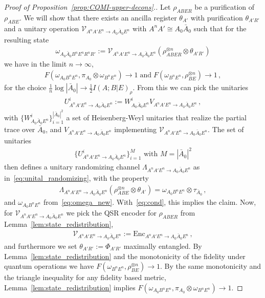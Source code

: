 \documentclass[a4paper,aps,prl,twocolumn,10pt,superscriptaddress]{revtex4-1}
\theoremstyle{plain}
\theoremstyle{definition}
\begin{document}
\begin{proof}[Proof of Proposition~\ref{prop:CQMI-upper-decons}.]
Let $\rho_{ABER}$ be a purification of $\rho_{ABE}$. We will show that there exists an ancilla register $\theta_{A'}$ with purification $\theta_{A'R'}$ and a unitary operation $\mathcal{V}_{A^nA'E^n\to A_0\bar{A}_0E^n}$ with $A^nA'\cong A_0\bar{A}_0$ such that for the resulting state
\begin{align}\label{eq:omega_new}
\omega_{A_0\bar{A}_0B^nE^nR^nR'}:=\mathcal{V}_{A^nA'E^n\to A_0\bar{A}_0E^n}\left(\rho_{ABER}^{\otimes n}\otimes\theta_{A'R'}\right)
\end{align}
we have in the limit $n\to\infty$,
\begin{align}\label{eq:cond}
F(\omega_{A_0B^nE^n},\pi_{A_0}\otimes\omega_{B^nE^n})\to1\;\mathrm{and}\;F\left(\omega_{B^nE^n},\rho_{BE}^{\otimes n}\right)\to1\,,
\end{align}
for the choice $\frac{1}{n}\log\left|\bar{A}_0\right|\to\frac{1}{2}I(A;B|E)_\rho$. From this we can pick the unitaries
\begin{align*}
U^i_{A^nA'E^n\to A_0\bar{A}_0E^n}:=W^i_{A_0\bar{A}_0E^n}V_{A^nA'E^n\to A_0\bar{A}_0E^n}\,,
\end{align*}
with $\{W^i_{A_0\bar{A}_0E^n}\}_{i=1}^{|\bar{A}_0|^2}$ a set of Heisenberg-Weyl unitaries that realize the partial trace over $\bar{A}_0$, and $V_{A^nA'E^n\to A_0\bar{A}_0E^n}$ implementing $\mathcal{V}_{A^nA'E^n\to A_0\bar{A}_0E^n}$. The set of unitaries
\begin{align*}
\text{$\{U^i_{A^nA'E^n\to A_0\bar{A}_0E^n}\}_{i=1}^M$ with $M=\left|\bar{A}_0\right|^2$}
\end{align*}
then defines a unitary randomizing channel $\Lambda_{A^nA'E^n\to A_0\bar{A}_0E^n}$ as in~\eqref{eq:unital_randomizing}, with the property
\begin{align*}
\Lambda_{A^nA'E^n\to A_0\bar{A}_0E^n}(\rho_{ABE}^{\otimes n}\otimes\theta_{A'})=\omega_{A_0B^nE^n}\otimes\tau_{\bar{A}_0}\,,
\end{align*}
and $\omega_{A_0B^nE^n}$ from~\eqref{eq:omega_new}. With~\eqref{eq:cond}, this implies the claim. Now, for $\mathcal{V}_{A^nA'E^n\to A_0\bar{A}_0E^n}$ we pick the QSR encoder for $\rho_{ABER}$ from Lemma~\ref{lem:state_redistribution},
\begin{align*}
\mathcal{V}_{A^nA'E^n\to A_0\bar{A}_0E^n}:=\mathrm{Enc}_{A^nA'E^n\to A_0\bar{A}_0E^n}\,,
\end{align*}
and furthermore we set $\theta_{A'R'}:=\Phi_{A'R'}$ maximally entangled. By Lemma~\ref{lem:state_redistribution} and the monotonicity of the fidelity under quantum operations we have $F\left(\omega_{B^nE^n},\rho_{BE}^{\otimes n}\right)\to1$. By the same monotonicity and the triangle inequality for any fidelity based metric, Lemma~\ref{lem:state_redistribution} implies $F(\omega_{A_0B^nE^n},\pi_{A_0}\otimes\omega_{B^nE^n})\to1$.
\end{proof}
\end{document}
